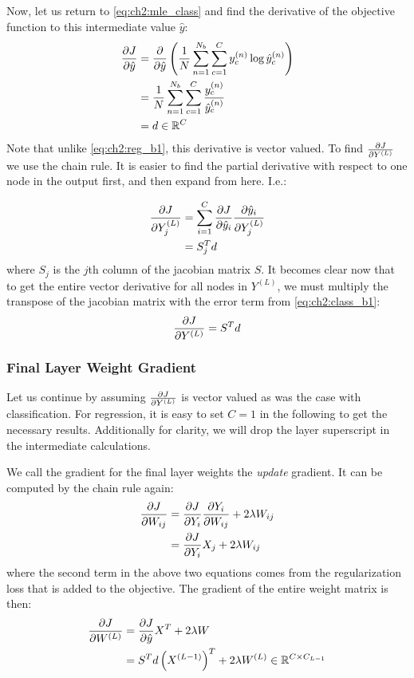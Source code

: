 Now, let us return to \eqref{eq:ch2:mle_class} and find the derivative of the
objective function to this intermediate value $\hat{y}$:
\begin{align}
  \dydx{J}{\hat{y}} &=  \dydx{}{\hat{y}} \left( \frac{1}{N}\sum_{n=1}^{N_b} \sum_{c=1}^C 
  y^{(n)}_c \log \hat{y}^{(n)}_c \right) \\
  &= \frac{1}{N}\sum_{n=1}^{N_b} \sum_{c=1}^C \frac{y^{(n)}_c}{\hat{y}^{(n)}_c} \\
  &= d \in \reals[C] \label{eq:ch2:class_b1}
\end{align}
Note that unlike \eqref{eq:ch2:reg_b1}, this derivative is vector valued. To
find $\dydx{J}{Y^{(L)}}$ we use the chain rule. It is easier to find the
partial derivative with respect to one node in the output first, and then expand
from here. I.e.:

\begin{align}
  \dydx{J}{Y^{(L)}_j} &= \sum_{i=1}^C \dydx{J}{\hat{y}_i}\dydx{\hat{y}_i}{Y^{(L)}_j} \\
                      &= S_j^T d
\end{align}
where $S_j$ is the $j$th column of the jacobian matrix $S$. It becomes clear now
that to get the entire vector derivative for all nodes in $Y^{(L)}$, we must
multiply the transpose of the jacobian matrix with the error term from
\eqref{eq:ch2:class_b1}:
\begin{equation}
  \dydx{J}{Y^{(L)}} = S^T d
\end{equation}

\subsubsection{Final Layer Weight Gradient} \label{sec:ch2:weight}
Let us continue by assuming $\dydx{J}{Y^{(L)}}$ is vector valued as was the case
with classification. For regression, it is easy to set $C=1$ in the following to
get the necessary results. Additionally for clarity, we will drop the layer
superscript in the intermediate calculations.

We call the gradient for the final layer weights the \emph{update} gradient. 
It can be computed by the chain rule again:
\begin{align}
  \dydx{J}{W_{ij}} &= \dydx{J}{Y_i} \dydx{Y_i}{W_{ij}} + 2\lambda W_{ij} \\
                   &= \dydx{J}{Y_i} X_j + 2\lambda W_{ij}
\end{align}
where the second term in the above two equations comes from the regularization
loss that is added to the objective. The gradient of the entire weight matrix is 
then:
\begin{align}
  \dydx{J}{W^{(L)}} &= \dydx{J}{\hat{y}} X^T +2\lambda W \\
                    &= S^T d \left(X^{(L-1)}\right)^T + 2\lambda W^{(L)} \in \reals[C \x C_{L-1}]
\end{align}

